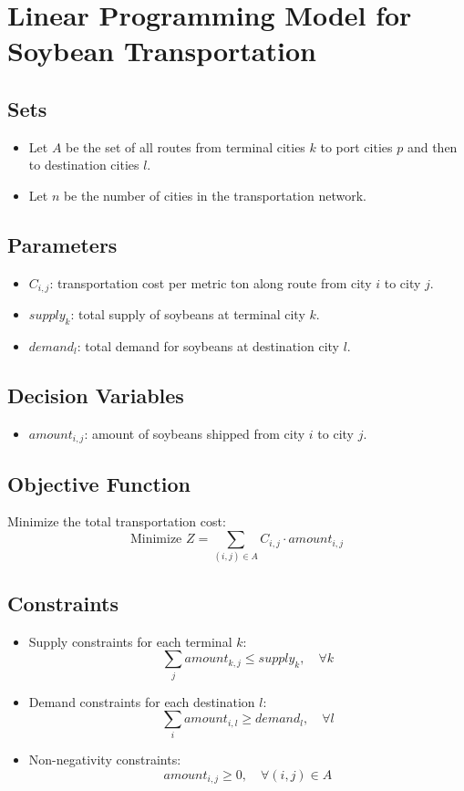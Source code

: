 \documentclass{article}
\begin{document}
\section*{Linear Programming Model for Soybean Transportation}

\subsection*{Sets}
\begin{itemize}
    \item Let \( A \) be the set of all routes from terminal cities \( k \) to port cities \( p \) and then to destination cities \( l \).
    \item Let \( n \) be the number of cities in the transportation network.
\end{itemize}

\subsection*{Parameters}
\begin{itemize}
    \item \( C_{i,j} \): transportation cost per metric ton along route from city \( i \) to city \( j \).
    \item \( supply_k \): total supply of soybeans at terminal city \( k \).
    \item \( demand_l \): total demand for soybeans at destination city \( l \).
\end{itemize}

\subsection*{Decision Variables}
\begin{itemize}
    \item \( amount_{i,j} \): amount of soybeans shipped from city \( i \) to city \( j \).
\end{itemize}

\subsection*{Objective Function}
Minimize the total transportation cost:
\[
\text{Minimize } Z = \sum_{(i,j) \in A} C_{i,j} \cdot amount_{i,j}
\]

\subsection*{Constraints}
\begin{itemize}
    \item Supply constraints for each terminal \( k \):
    \[
    \sum_{j} amount_{k,j} \leq supply_k, \quad \forall k
    \]

    \item Demand constraints for each destination \( l \):
    \[
    \sum_{i} amount_{i,l} \geq demand_l, \quad \forall l
    \]

    \item Non-negativity constraints:
    \[
    amount_{i,j} \geq 0, \quad \forall (i,j) \in A
    \]
\end{itemize}
\end{document}
